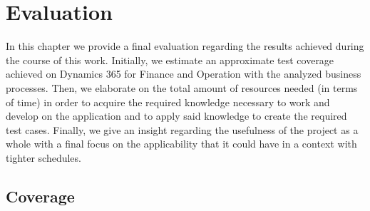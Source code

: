 \chapter{Evaluation}

In this chapter we provide a final evaluation regarding the results achieved during the course of this work. Initially, we estimate an approximate test coverage achieved on Dynamics 365 for Finance and Operation with the analyzed business processes. Then, we elaborate on the total amount of resources needed (in terms of time) in order to acquire the required knowledge necessary to work and develop on the application and to apply said knowledge to create the required test cases. Finally, we give an insight regarding the usefulness of the project as a whole with a final focus on the applicability that it could have in a context with tighter schedules.

\section{Coverage} 

